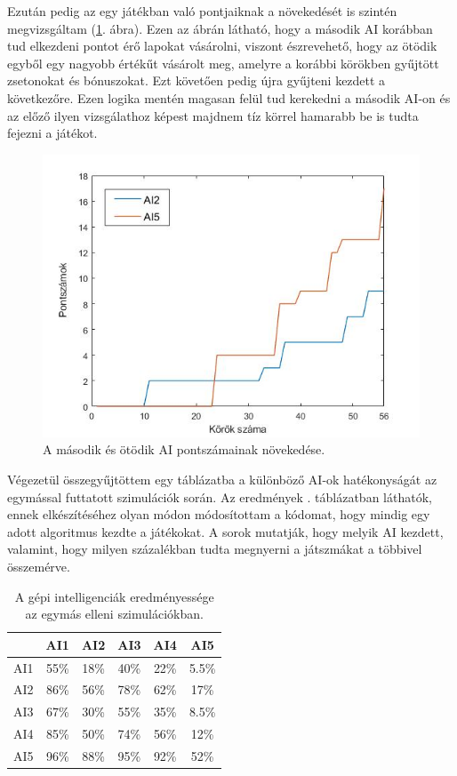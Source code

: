 Ezután pedig az egy játékban való pontjaiknak a növekedését is szintén megvizsgáltam (\ref{fig:player_scores2v5}. ábra). Ezen az ábrán látható, hogy a második AI korábban tud elkezdeni pontot érő lapokat vásárolni, viszont észrevehető, hogy az ötödik egyből egy nagyobb értékűt vásárolt meg, amelyre a korábbi körökben gyűjtött zsetonokat és bónuszokat. Ezt követően pedig újra gyűjteni kezdett a következőre. Ezen logika mentén magasan felül tud kerekedni a második AI-on és az előző ilyen vizsgálathoz képest majdnem tíz körrel hamarabb be is tudta fejezni a játékot.

\begin{figure}[H]
\centering
\includegraphics[scale=0.6]{images/player_points_AI2vsAI5.jpg}
\caption{A második és ötödik AI pontszámainak növekedése.}
\label{fig:player_scores2v5}
\end{figure}


Végezetül összegyűjtöttem egy táblázatba a különböző AI-ok hatékonyságát az egymással futtatott szimulációk során. Az eredmények . táblázatban láthatók, ennek elkészítéséhez olyan módon módosítottam a kódomat, hogy mindig egy adott algoritmus kezdte a játékokat. A sorok mutatják, hogy melyik AI kezdett, valamint, hogy milyen százalékban tudta megnyerni a játszmákat a többivel összemérve.

\begin{table}[h]
\caption{A gépi intelligenciák eredményessége az egymás elleni szimulációkban.}
\label{tab:ai_comparison}
\medskip
\centering
\begin{tabular}{|c|c|c|c|c|c|} 
 \hline
  & AI1 & AI2 & AI3 & AI4 & AI5 \\ 
 \hline
 AI1 & 55\% & 18\% & 40\% & 22\% & 5.5\%\\ 
 \hline
 AI2 & 86\% & 56\% & 78\% & 62\% & 17\%\\ 
 \hline
 AI3 & 67\% & 30\% & 55\% & 35\% & 8.5\%\\ 
 \hline
 AI4 & 85\% & 50\% & 74\% & 56\% & 12\%\\ 
 \hline
 AI5 & 96\% & 88\% & 95\% & 92\% & 52\%\\
 \hline
\end{tabular}
\end{table}

